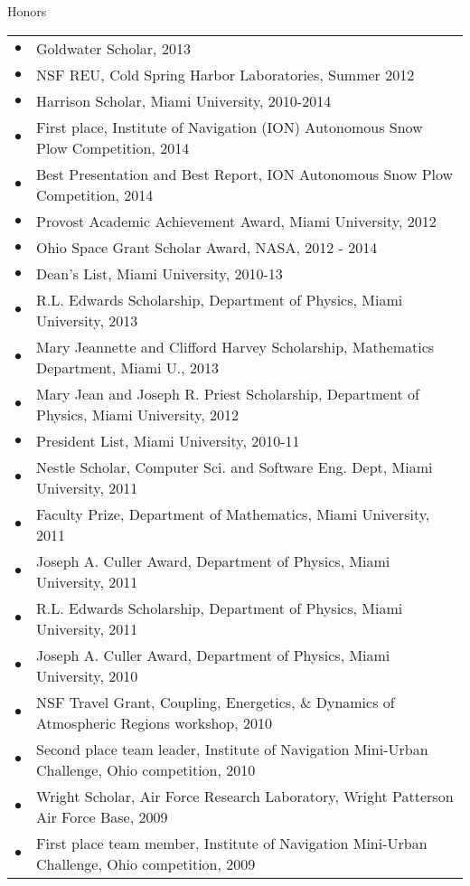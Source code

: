 \documentclass{resume} %
\begin{document}
\begin{rSection}{Honors}
  \begin{tabular}{ll}
    $\bullet$ & Goldwater Scholar, 2013\\
    $\bullet$ & NSF REU, Cold Spring Harbor Laboratories, Summer 2012\\
    $\bullet$ & Harrison Scholar, Miami University, 2010-2014\\
    $\bullet$ & First place, Institute of Navigation (ION) Autonomous Snow Plow Competition, 2014\\  
    $\bullet$ & Best Presentation and Best Report, ION Autonomous Snow Plow Competition, 2014\\
    $\bullet$ & Provost Academic Achievement Award, Miami University, 2012\\
    $\bullet$ & Ohio Space Grant Scholar Award, NASA, 2012 - 2014\\
    $\bullet$ & Dean’s List, Miami University, 2010-13\\
    $\bullet$ & R.L. Edwards Scholarship, Department of Physics, Miami University, 2013\\
    $\bullet$ & Mary Jeannette and Clifford Harvey Scholarship, Mathematics Department, Miami U., 2013\\
    $\bullet$ & Mary Jean and Joseph R. Priest Scholarship, Department of Physics, Miami University, 2012\\
    $\bullet$ & President List, Miami University, 2010-11\\
    $\bullet$ & Nestle Scholar, Computer Sci. and Software Eng. Dept, Miami University, 2011\\
    $\bullet$ & Faculty Prize, Department of Mathematics, Miami University, 2011\\
    $\bullet$ & Joseph A. Culler Award, Department of Physics, Miami University, 2011\\
    $\bullet$ & R.L. Edwards Scholarship, Department of Physics, Miami University, 2011\\
    $\bullet$ & Joseph A. Culler Award, Department of Physics, Miami University, 2010\\
    $\bullet$ & NSF Travel Grant, Coupling, Energetics, \& Dynamics of Atmospheric Regions workshop, 2010\\
    $\bullet$ & Second place team leader, Institute of Navigation Mini-Urban Challenge, Ohio competition, 2010\\
    $\bullet$ & Wright Scholar, Air Force Research Laboratory, Wright Patterson Air Force Base, 2009\\
    $\bullet$ & First place team member, Institute of Navigation Mini-Urban Challenge, Ohio competition, 2009\\
  \end{tabular}
\end{rSection}
\end{document}

